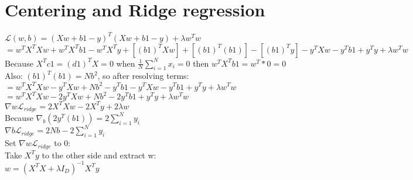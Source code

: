 \section{Centering and Ridge regression}
$\mathcal{L}(w,b)=(Xw +b1-y)^{T}(Xw +b1-y)+\lambda w^{T}w$\\ $=w^{T}X^{T}Xw+w^{T}
X^{T}b1-w^{T}X^{T}y +[(b1)^{T}Xw]+[(b1)^{T}(b1)]-[(b1)^{T}y]-y^{T}Xw-y^{T}b1+y^{T}
y+\lambda w^{T}w$\\ Because $X^{T}c1=(d1)^{T}X=0$ when
$\frac{1}{N}\sum_{i=1}^{N}x_{i}= 0$ then $w^{T}X^{T}b1=w^{T}*0=0$\\ Also:
$(b1)^{T}(b1) = Nb^{2}$, so after resolving terms:\\ $=w^{T}X^{T}Xw-y^{T}Xw +Nb^{2}
-y^{T}b1-y^{T}Xw-y^{T}b1 +y^{T}y +\lambda w^{T}w$\\
$=w^{T}X^{T}Xw-2y^{T}Xw +Nb^{2}-2y^{T}b1+y^{T}y +\lambda w^{T}w$\\ $\nabla{w}\mathcal{L}
_{ridge}=2X^{T}Xw-2X^{T}y+2\lambda w$\\ Because
$\nabla_{b}(2y^{T}(b1))=2\sum_{i=1}^{N}y_{i}$\\ $\nabla{b}\mathcal{L}_{ridge}=2N
b-2\sum_{i=1}^{N}y_{i}$\\ Set $\nabla{w}\mathcal{L}_{ridge}$ to 0:\\ Take
$X^{T}y$ to the other side and extract w:\\
$w=(X^{T}X+\lambda I_{D})^{-1}X^{T}y$\\